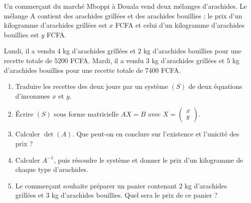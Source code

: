 \documentclass[11pt]{article}
\begin{document}
\begin{exercice}
Un commerçant du marché Mboppi à Douala vend deux mélanges d'arachides. Le mélange A contient des arachides grillées et des arachides bouillies ; le prix d'un kilogramme d'arachides grillées est $x$ FCFA et celui d'un kilogramme d'arachides bouillies est $y$ FCFA.

Lundi, il a vendu $4$ kg d'arachides grillées et $2$ kg d'arachides bouillies pour une recette totale de $\num{5200}$ FCFA. Mardi, il a vendu $3$ kg d'arachides grillées et $5$ kg d'arachides bouillies pour une recette totale de $\num{7400}$ FCFA.
\begin{enumerate}
\item Traduire les recettes des deux jours par un système $(S)$ de deux équations d'inconnues $x$ et $y$.
\item Écrire $(S)$ sous forme matricielle $AX = B$ avec $X = \begin{pmatrix} x \\ y \end{pmatrix}$.
\item Calculer $\det(A)$. Que peut-on en conclure sur l'existence et l'unicité des prix ?
\item Calculer $A^{-1}$, puis résoudre le système et donner le prix d'un kilogramme de chaque type d'arachides.
\item Le commerçant souhaite préparer un panier contenant $2$ kg d'arachides grillées et $3$ kg d'arachides bouillies. Quel sera le prix de ce panier ?
\end{enumerate}
\end{exercice}
\end{document}
